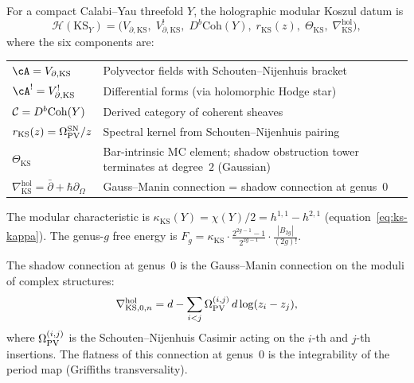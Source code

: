 \begin{theorem}
For a compact Calabi--Yau threefold $Y$, the holographic modular
Koszul datum is
\begin{equation}%
\mathcal{H}(\mathrm{KS}_Y)
= \bigl(
V_{\partial,\mathrm{KS}},\;
V_{\partial,\mathrm{KS}}^!,\;
D^b\mathrm{Coh}(Y),\;
r_{\mathrm{KS}}(z),\;
\Theta_{\mathrm{KS}},\;
\nabla^{\mathrm{hol}}_{\mathrm{KS}}
\bigr),
\end{equation}
where the six components are:
\begin{center}
\renewcommand{\arraystretch}{1.25}
\begin{tabular}{lp{9cm}}
\hline
$\cA = V_{\partial,\mathrm{KS}}$
& Polyvector fields with Schouten--Nijenhuis bracket \\
$\cA^! = V^!_{\partial,\mathrm{KS}}$
& Differential forms (via holomorphic Hodge star) \\
$\mathcal C = D^b\mathrm{Coh}(Y)$
& Derived category of coherent sheaves \\
$r_{\mathrm{KS}}(z)
= \Omega_{\operatorname{PV}}^{\mathrm{SN}}/z$
& Spectral kernel from Schouten--Nijenhuis pairing \\
$\Theta_{\mathrm{KS}}$
& Bar-intrinsic MC element; shadow obstruction tower terminates at
degree~$2$ (Gaussian) \\
$\nabla^{\mathrm{hol}}_{\mathrm{KS}}
= \bar\partial + \hbar\partial_\Omega$
& Gauss--Manin connection = shadow connection at
genus~$0$ \\
\hline
\end{tabular}
\end{center}
The modular characteristic is $\kappa_{\mathrm{KS}}(Y)
= \chi(Y)/2 = h^{1,1}-h^{2,1}$
(equation~\eqref{eq:ks-kappa}). The genus-$g$ free energy is
$F_g = \kappa_{\mathrm{KS}}\cdot\tfrac{2^{2g-1}-1}{2^{2g-1}}\cdot\tfrac{|B_{2g}|}{(2g)!}$.

The shadow connection at genus~$0$ is the Gauss--Manin
connection on the moduli of complex structures:
\begin{equation}%
\nabla^{\mathrm{hol}}_{\mathrm{KS},0,n}
= d - \sum_{i<j}
\Omega_{\PV}^{(i,j)}\,d\log(z_i-z_j),
\end{equation}
where $\Omega_{\operatorname{PV}}^{(i,j)}$ is the Schouten--Nijenhuis Casimir
acting on the $i$-th and $j$-th insertions. The flatness of
this connection at genus~$0$ is the integrability of the period
map (Griffiths transversality).
\end{theorem}

